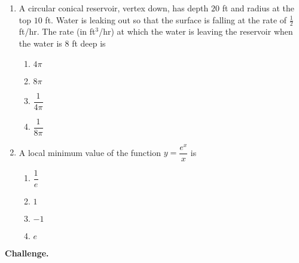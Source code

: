 \documentclass[12pt]{article}
\begin{document}
\begin{enumerate}[label=\textbf{A\arabic*.},resume]
\item A circular conical reservoir, vertex down, has depth $20$ ft and radius at the top $10$ ft. Water is leaking out so that the surface is falling at the rate of $\tfrac12$ ft/hr. The rate (in ft$^{3}$/hr) at which the water is leaving the reservoir when the water is $8$ ft deep is
\begin{enumerate}[label=(\Alph*)]
\item $4\pi$ \item $8\pi$ \item $\dfrac{1}{4\pi}$ \item $\dfrac{1}{8\pi}$
\end{enumerate}

\item A local minimum value of the function $y=\dfrac{e^{x}}{x}$ is
\begin{enumerate}[label=(\Alph*)]
\item $\dfrac{1}{e}$ \item $1$ \item $-1$ \item $e$
\end{enumerate}

\end{enumerate}

\textbf{Challenge.}
\end{document}
